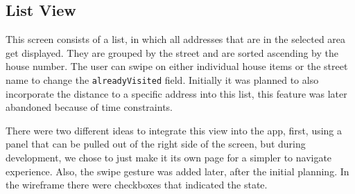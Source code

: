 \subsection{List View}

This screen consists of a list, in which all addresses that are in the selected area get displayed. They are grouped by the street and are sorted ascending by the house number. The user can swipe on either individual house items or the street name to change the \texttt{alreadyVisited} field. Initially it was planned to also incorporate the distance to a specific address into this list, this feature was later abandoned because of time constraints. 

\blankLine

There were two different ideas to integrate this view into the app, first, using a panel that can be pulled out of the right side of the screen, but during development, we chose to just make it its own page for a simpler to navigate experience. Also, the swipe gesture was added later, after the initial planning. In the wireframe there were checkboxes that indicated the state.

